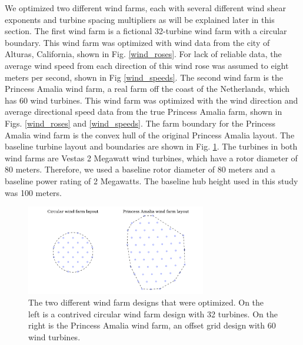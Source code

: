 \documentclass[wes, manuscript]{copernicus}
\begin{document}
We optimized two different wind farms, each with several different wind shear exponents and turbine spacing multipliers as will be explained later in this section. 
The first wind farm is a fictional 32-turbine wind farm with a circular boundary. %
This wind farm was optimized with wind data from the city of Alturas, California, shown in Fig. \ref{wind_roses}.  For lack of reliable data, the average wind speed from each direction of this wind rose was assumed to eight meters per second, shown in Fig \ref{wind_speeds}.
The second wind farm is the Princess Amalia wind farm, a real farm off the coast of the Netherlands, which has 60 wind turbines. This wind farm was optimized with the wind direction and average directional speed data from the true Princess Amalia farm, shown in Figs. \ref{wind_roses} and \ref{wind_speeds}. The farm boundary for the Princess Amalia wind farm is the convex hull of the original Princess Amalia layout. The baseline turbine layout and boundaries are shown in Fig. \ref{layouts}. The turbines in both wind farms are Vestas 2 Megawatt wind turbines, which have a rotor diameter of 80 meters. Therefore, we used a baseline rotor diameter of 80 meters and a baseline power rating of 2 Megawatts. The baseline hub height used in this study was 100 meters. 

\begin{figure}[htbp]
  \centering
   \includegraphics[width=0.7\textwidth]{Figures/baseline_layouts.pdf}
  \caption{\label{layouts} The two different wind farm designs that were optimized. On the left is a contrived circular wind farm design with 32 turbines. On the right is the Princess Amalia wind farm, an offset grid design with 60 wind turbines. }
\end{figure}
\end{document}
